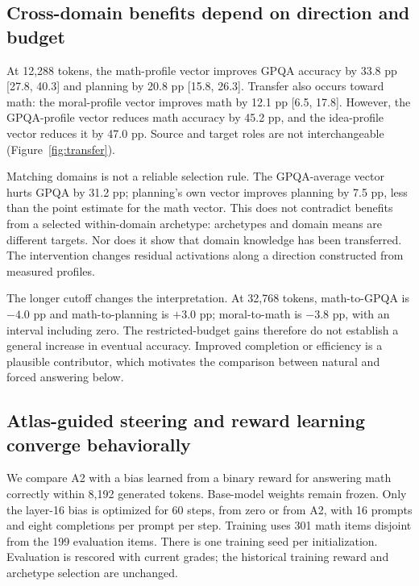 \subsection{Cross-domain benefits depend on direction and budget}
At 12,288 tokens, the math-profile vector improves GPQA accuracy by 33.8 pp [27.8, 40.3] and planning by 20.8 pp [15.8, 26.3]. Transfer also occurs toward math: the moral-profile vector improves math by 12.1 pp [6.5, 17.8]. However, the GPQA-profile vector reduces math accuracy by 45.2 pp, and the idea-profile vector reduces it by 47.0 pp. Source and target roles are not interchangeable (Figure~\ref{fig:transfer}).

Matching domains is not a reliable selection rule. The GPQA-average vector hurts GPQA by 31.2 pp; planning's own vector improves planning by 7.5 pp, less than the point estimate for the math vector. This does not contradict benefits from a selected within-domain archetype: archetypes and domain means are different targets. Nor does it show that domain knowledge has been transferred. The intervention changes residual activations along a direction constructed from measured profiles.

The longer cutoff changes the interpretation. At 32,768 tokens, math-to-GPQA is $-4.0$ pp and math-to-planning is $+3.0$ pp; moral-to-math is $-3.8$ pp, with an interval including zero. The restricted-budget gains therefore do not establish a general increase in eventual accuracy. Improved completion or efficiency is a plausible contributor, which motivates the comparison between natural and forced answering below.

\subsection{Atlas-guided steering and reward learning converge behaviorally}
We compare A2 with a bias learned from a binary reward for answering math correctly within 8,192 generated tokens. Base-model weights remain frozen. Only the layer-16 bias is optimized for 60 steps, from zero or from A2, with 16 prompts and eight completions per prompt per step. Training uses 301 math items disjoint from the 199 evaluation items. There is one training seed per initialization. Evaluation is rescored with current grades; the historical training reward and archetype selection are unchanged.

